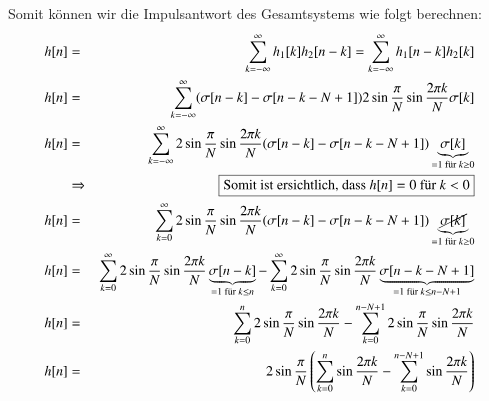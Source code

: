 \begin{uebsp}
\begin{Answer}
\begin{enumerate}[a)]
\begin{enumerate}
\begin{uebsp_theory}
\begin{center}
\begin{tikzpicture}
                    \end{tikzpicture}
                \end{center}
                \end{uebsp_theory}
                Somit können wir die Impulsantwort des Gesamtsystems wie folgt
                berechnen:
                \begin{eqnarray*}
                    h[n]&=&\sum_{k=-\infty}^\infty h_1[k]h_2[n-k] = \sum_{k=-\infty}^\infty h_1[n-k]h_2[k]\\
                    h[n]&=&\sum_{k=-\infty}^\infty
                        (\sigma[n-k]-\sigma[n-k-N+1])2\sin\frac{\pi}{N}\sin\frac{2\pi
                        k}{N}\sigma[k]\\
                    h[n]&=&\sum_{k=-\infty}^\infty
                        2\sin\frac{\pi}{N}\sin\frac{2\pi
                        k}{N}(\sigma[n-k]-\sigma[n-k-N+1])\underbrace{\sigma[k]}_{=1\text{
                        für }k\geq 0}\\
                        &\Rightarrow&\fbox{Somit ist ersichtlich, dass $h[n]=0$ für
                            $k<0$}\\
                    h[n]&=&\sum_{k=0}^\infty
                        2\sin\frac{\pi}{N}\sin\frac{2\pi
                        k}{N}(\sigma[n-k]-\sigma[n-k-N+1])\underbrace{\cancel{\sigma[k]}}_{=1\text{
                        für }k\geq 0}\\
                    h[n]&=&\sum_{k=0}^\infty
                        2\sin\frac{\pi}{N}\sin\frac{2\pi
                        k}{N}\underbrace{\sigma[n-k]}_{=1\text{ für }k\leq n}-\sum_{k=0}^\infty
                        2\sin\frac{\pi}{N}\sin\frac{2\pi
                        k}{N}\underbrace{\sigma[n-k-N+1]}_{=1\text{ für }k\leq
                        n-N+1}\\
                    h[n]&=&\sum_{k=0}^n
                        2\sin\frac{\pi}{N}\sin\frac{2\pi
                        k}{N}
                        -\sum_{k=0}^{n-N+1}
                        2\sin\frac{\pi}{N}\sin\frac{2\pi
                        k}{N}\\
                        h[n]&=&2\sin\frac{\pi}{N}\left(\sum_{k=0}^n
                        \sin\frac{2\pi
                        k}{N}
                        -\sum_{k=0}^{n-N+1}
                        \sin\frac{2\pi
                        k}{N}\right)
                \end{eqnarray*}
                \begin{definition}

\end{definition}
\end{enumerate}
\end{enumerate}
\end{Answer}
\end{uebsp}
